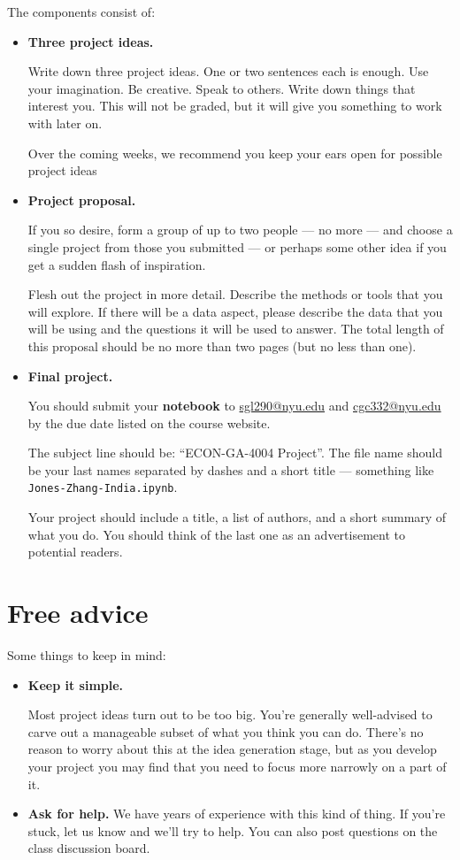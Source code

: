 \documentclass[11pt]{article}
\begin{document}
The components consist of:
\begin{itemize}

\item {\bf Three project ideas.}

Write down three project ideas. One or two sentences each is enough.
Use your imagination.  Be creative.  Speak to others. Write down things that
interest you. This will not be graded, but it will give you something to work
with later on.

Over the coming weeks, we recommend you keep your ears open for possible project ideas

\item{\bf Project proposal.}

If you so desire, form a group of up to two people --- no more --- and choose
a single project from those you submitted --- or perhaps some other idea if you
get a sudden flash of inspiration.

Flesh out the project in more detail. Describe the methods or tools that you will explore. If
there will be a data aspect, please describe the data that you will be using and the questions it
will be used to answer. The total length of this proposal should be no more than two pages (but no
less than one).

\item {\bf Final project.}

You should submit your {\bf notebook\/} to \href{mailto:sgl290@nyu.edu}{sgl290@nyu.edu} and
\href{mailto:cgc332@nyu.edu}{cgc332@nyu.edu} by the due date listed on the course website.

The subject line should be:  ``ECON-GA-4004 Project''. The
file name should be your last names separated by dashes and a short title ---
something like {\tt Jones-Zhang-India.ipynb}.

Your project should include a title, a list of authors, and a short summary of what you do. You
should think of the last one as an advertisement to potential readers.

\end{itemize}

\section*{Free advice}

Some things to keep in mind:
%
\begin{itemize}
\item {\bf Keep it simple.}

Most project ideas turn out to be too big.  You're generally well-advised to
carve out a manageable subset of what you think you can do. There's no reason to
worry about this at the idea generation stage, but as you develop your project
you may find that you need to focus more narrowly on a part of it.

\item {\bf Ask for help.}
We have years of experience with this kind of thing. If you're stuck, let us
know and we'll try to help. You can also post questions on the class discussion
board.

\end{itemize}
\end{document}
